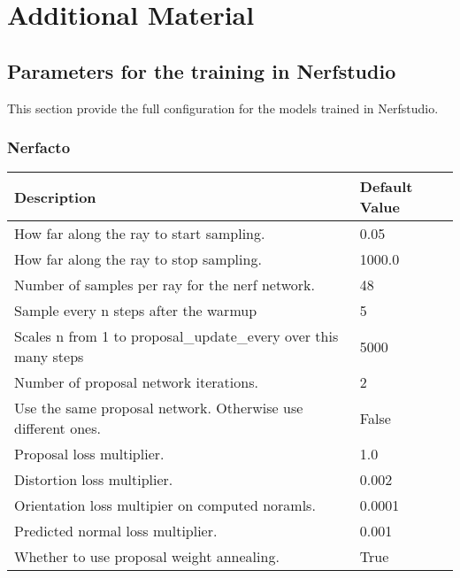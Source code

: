\chapter{Additional Material} \label{app:additional}

\section{Parameters for the training in Nerfstudio} \label{sec:nerfstudio-train-parameters}
This section provide the full configuration for the models trained in Nerfstudio.

\subsection{Nerfacto}
\begin{table}[H]
    \centering
    \begin{tabular}{|l|l|}
    \hline
    \textbf{Description}                                             & \textbf{Default Value} \\
    \hline
    How far along the ray to start sampling.                & 0.05 \\
    How far along the ray to stop sampling.                 & 1000.0 \\
    Number of samples per ray for the nerf network.         & 48 \\
    Sample every n steps after the warmup                   & 5 \\
    Scales n from 1 to proposal\_update\_every over this many steps & 5000 \\
    Number of proposal network iterations.                  & 2 \\
    Use the same proposal network. Otherwise use different ones. & False \\
    Proposal loss multiplier.                               & 1.0 \\
    Distortion loss multiplier.                             & 0.002 \\
    Orientation loss multipier on computed noramls.         & 0.0001 \\
    Predicted normal loss multiplier.                       & 0.001 \\
    Whether to use proposal weight annealing.               & True \\

\end{tabular}
\end{table}
